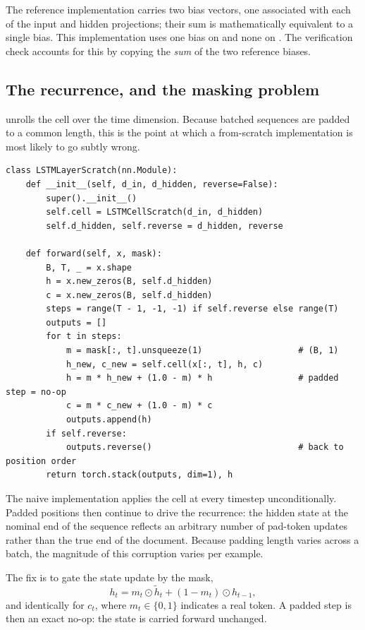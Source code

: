  The reference implementation carries two bias vectors, one associated
with each of the input and hidden projections; their sum is mathematically equivalent to a single
bias. This implementation uses one bias on  and none on . The verification check
accounts for this by copying the \emph{sum} of the two reference biases.

\subsection{The recurrence, and the masking problem}

 unrolls the cell over the time dimension. Because batched sequences are
padded to a common length, this is the point at which a from-scratch implementation is most
likely to go subtly wrong.

{\small
\begin{verbatim}
class LSTMLayerScratch(nn.Module):
    def __init__(self, d_in, d_hidden, reverse=False):
        super().__init__()
        self.cell = LSTMCellScratch(d_in, d_hidden)
        self.d_hidden, self.reverse = d_hidden, reverse

    def forward(self, x, mask):
        B, T, _ = x.shape
        h = x.new_zeros(B, self.d_hidden)
        c = x.new_zeros(B, self.d_hidden)
        steps = range(T - 1, -1, -1) if self.reverse else range(T)
        outputs = []
        for t in steps:
            m = mask[:, t].unsqueeze(1)                   # (B, 1)
            h_new, c_new = self.cell(x[:, t], h, c)
            h = m * h_new + (1.0 - m) * h                 # padded step = no-op
            c = m * c_new + (1.0 - m) * c
            outputs.append(h)
        if self.reverse:
            outputs.reverse()                             # back to position order
        return torch.stack(outputs, dim=1), h
\end{verbatim}}

 The naive implementation applies the cell at
every timestep unconditionally. Padded positions then continue to drive the recurrence: the hidden
state at the nominal end of the sequence reflects an arbitrary number of pad-token updates rather
than the true end of the document. Because padding length varies across a batch, the magnitude of
this corruption varies per example.

The fix is to gate the state update by the mask,
\begin{equation}
h_t = m_t \odot \tilde{h}_t + (1 - m_t) \odot h_{t-1},
\end{equation}
and identically for $c_t$, where $m_t \in \{0,1\}$ indicates a real token. A padded step is then an
exact no-op: the state is carried forward unchanged.


